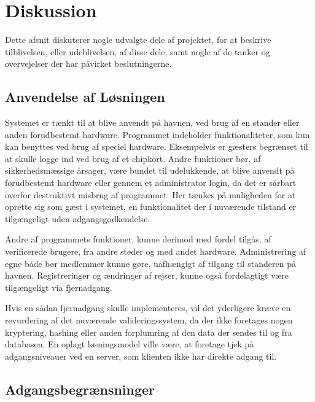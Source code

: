 \chapter{Diskussion}
\label{cha:diskussion}


Dette afsnit diskuterer nogle udvalgte dele af projektet, for at beskrive tilblivelsen, eller udeblivelsen, af disse dele, samt nogle af de tanker og overvejelser der har påvirket beslutningerne.

\section{Anvendelse af Løsningen} 
\label{sec:anvendelse_af_systemet}

Systemet er tænkt til at blive anvendt på havnen, ved brug af en stander eller anden forudbestemt hardware. Programmet indeholder funktionaliteter, som kun kan benyttes ved brug af speciel hardware. Eksempelvis er gæsters begrænset til at skulle logge ind ved brug af et chipkort. Andre funktioner bør, af sikkerhedsmæssige årsager, være bundet til udelukkende, at blive anvendt på forudbestemt hardware eller gennem et administrator login, da det er sårbart overfor destruktivt misbrug af programmet. Her tænkes på muligheden for at oprette sig som gæst i systemet, en funktionalitet der i nuværende tilstand er tilgængeligt uden adgangsgodkendelse.

Andre af programmets funktioner, kunne derimod med fordel tilgås, af verificerede brugere, fra andre steder og med andet hardware. Administrering af egne både bør medlemmer kunne gøre, uafhængigt af tilgang til standeren på havnen. Registreringer og ændringer af rejser, kunne også fordelagtigt være tilgængeligt via fjernadgang.

Hvis en sådan fjernadgang skulle implementeres, vil det yderligere kræve en revurdering af det nuværende valideringssystem, da der ikke foretages nogen kryptering, hashing eller anden forplumring af den data der sendes til og fra databasen. En oplagt løsningsmodel ville være, at foretage tjek på adgangsniveauer ved en server, som klienten ikke har direkte adgang til.


\section{Adgangsbegrænsninger}

